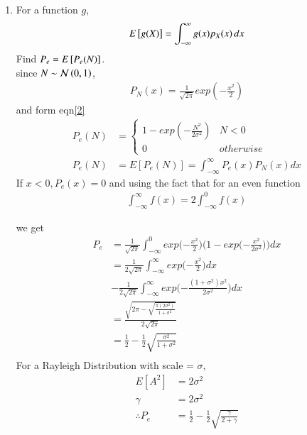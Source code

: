 \documentclass[journal,12pt,twocolumn]{IEEEtran}
\renewcommand\thesection{\arabic{section}}
\begin{document}
\begin{enumerate}[label=\thesection.\arabic*
,ref=\thesection.\theenumi]
\begin{align}\label{2}
\therefore   P_e(N) &=
    \begin{cases}
        1 - exp(-\frac{N^2}{2\sigma^2}) & N<0
        \\
        0 & otherwise 
    \end{cases}
\end{align}
\item
%
\label{ch4_anal}
For a function $g$,
\begin{equation}
E{}\left[g(X)\right] = \int_{-\infty}^{\infty}g(x)p_{X}(x)\, dx
\end{equation}
%
Find $P_e = E{}\left[P_e(N)\right]$.\\
%
\solution since $N \sim \mathcal{N}\left(0,1\right)$,
\begin{align}
    P_N(x) = \frac{1}{\sqrt{2\pi}} exp(-\frac{x^2}{2})
\end{align}
and form eqn\ref{2} 
\begin{align}
    P_e(N) &=
        \begin{cases}
            1 - exp(-\frac{N^2}{2\sigma^2}) & N<0
            \\
            0 & otherwise 
        \end{cases}\\
        P_e(N) &= E[P_e(N)]=\int_{-\infty}^{\infty}P_e(x)P_N(x)dx
    \end{align} 
If $x<0 , P_e(x) = 0$ and using the fact that for an even function
\begin{align}
    \int_{-\infty}^{\infty} f(x) = 2\int_{-\infty}^{0} f(x)
\end{align}

we get 
\begin{align}
    P_e &= \frac{1}{\sqrt{2\pi}} \int_{-\infty}^{0} exp\bigg({-\frac{x^2}{2}}\bigg)\bigg(1-exp\bigg({-\frac{x^2}{2\sigma^2}}\bigg)\bigg)dx\\
    &= \frac{1}{2\sqrt{2\pi}}\int_{-\infty}^{\infty} exp\bigg({-\frac{x^2}{2}}\bigg)dx\\ &- \frac{1}{2\sqrt{2\pi}}\int_{-\infty}^{\infty} exp\bigg({-\frac{(1+\sigma^2)x^2}{2\sigma^2}}\bigg)dx\\
    &= \frac{\sqrt{2\pi - \sqrt{\frac{\pi(2\sigma^2)}{1+\sigma^2}}}}{2\sqrt{2\pi}}\\
    &=\frac{1}{2} - \frac{1}{2}\sqrt{\frac{\sigma^2}{1+\sigma^2}}\\    
\end{align}
For a Rayleigh Distribution with scale = $\sigma$,
\begin{align}
    E[A^2] &= 2\sigma^2 \\
    \gamma &= 2\sigma^2 \\
    \therefore P_e &=\frac{1}{2} - \frac{1}{2}\sqrt{\frac{\gamma}{2+\gamma}}
\end{align}


\end{enumerate}
\end{document}
